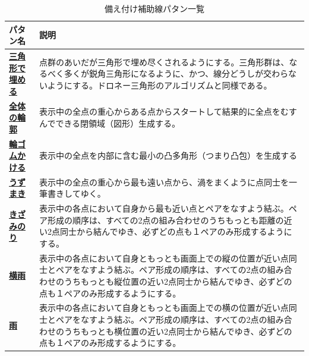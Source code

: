 \begin{table}[H]
  \caption{備え付け補助線パタン一覧}
  \label{table:presetpatterns}
  \begin{center}
  \begin{tabularx}{\textwidth}{>{\bfseries}lX}
    \hline
    パタン名 & 説明 \\
    \hline
    \href{https://takahitohoriuchi.github.io/hj-playground_gallery/pattern_sankakkei.html}{三角形で埋める} & 点群のあいだが三角形で埋め尽くされるようにする。三角形群は、なるべく多くが鋭角三角形になるように、かつ、線分どうしが交わらないようにする。ドロネー三角形のアルゴリズムと同様である。 \\
    \hline
    \href{https://takahitohoriuchi.github.io/hj-playground_gallery/pattern_rinkaku.html}{全体の輪郭} & 表示中の全点の重心からある点からスタートして結果的に全点をむすんでできる閉領域（図形）生成する。 \\
    \hline
    \href{https://takahitohoriuchi.github.io/hj-playground_gallery/pattern_wagomu.html}{輪ゴムかける} & 表示中の全点を内部に含む最小の凸多角形（つまり凸包）を生成する \\
    \hline
    \href{https://takahitohoriuchi.github.io/hj-playground_gallery/pattern_uzumaki.html}{うずまき} & 表示中の全点の重心から最も遠い点から、渦をまくように点同士を一筆書きしてゆく。 \\
    \hline
    \href{https://takahitohoriuchi.github.io/hj-playground_gallery/pattern_kizaminori.html}{きざみのり} & 表示中の各点において自身から最も近い点とペアをなすよう結ぶ。ペア形成の順序は、すべての2点の組み合わせのうちもっとも距離の近い2点同士から結んでゆき、必ずどの点も１ペアのみ形成するようにする。\\
    \hline
    \href{https://takahitohoriuchi.github.io/hj-playground_gallery/pattern_yokoame.html}{横雨} & 表示中の各点において自身ともっとも画面上での縦の位置が近い点同士とペアをなすよう結ぶ。ペア形成の順序は、すべての2点の組み合わせのうちもっとも縦位置の近い2点同士から結んでゆき、必ずどの点も１ペアのみ形成するようにする。\\
    \hline
    \href{https://takahitohoriuchi.github.io/hj-playground_gallery/pattern_ame.html}{雨} & 表示中の各点において自身ともっとも画面上での横の位置が近い点同士とペアをなすよう結ぶ。ペア形成の順序は、すべての2点の組み合わせのうちもっとも横位置の近い2点同士から結んでゆき、必ずどの点も１ペアのみ形成するようにする。 \\

\end{tabularx}
\end{center}
\end{table}
